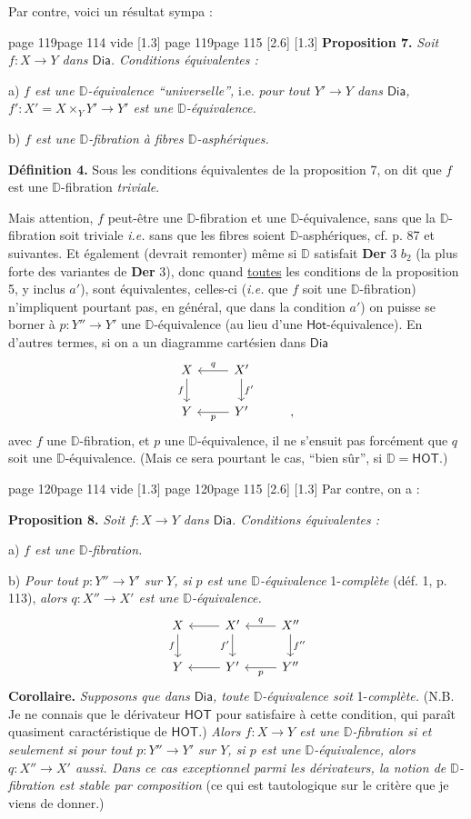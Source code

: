\documentclass[11pt,leqno]{article}
\newcommand{\msp}[1]{%
  \begingroup\def\thismsp{#1}\def\blankmsp{page 114 vide}%
  \ifx\thismsp\blankmsp
    \marginnote{\scriptsize\sffamily [114: vide]}[1.3\baselineskip]%
  \else\def\followingmsp{page 115}%
    \ifx\thismsp\followingmsp
      \marginnote{\scriptsize\sffamily [page 115]}[2.6\baselineskip]%
    \else\marginnote{\scriptsize\sffamily [#1]}[1.3\baselineskip]\fi
  \fi\endgroup}
\newcommand{\Dia}{\ensuremath{\mathsf{Dia}}}
\newcommand{\Hot}{\ensuremath{\mathsf{Hot}}}
\newcommand{\HOT}{\ensuremath{\mathsf{HOT}}}
\newcommand{\D}{\ensuremath{\mathbb{D}}}
\begin{document}
Par contre, voici un résultat sympa :

\msp{page 119}\textbf{Proposition 7.} \textit{Soit $f : X \to Y$ dans \Dia. Conditions équivalentes :}

a) \textit{$f$ est une $\D$-équivalence “universelle”,} i.e. \textit{pour tout $Y' \to Y$ dans \Dia, $f' : X' = X \times_Y Y' \to Y'$ est une $\D$-équivalence.}

b) \textit{$f$ est une $\D$-fibration à fibres $\D$-asphériques.}

\textbf{Définition 4.} Sous les conditions équivalentes de la proposition 7, on dit que $f$ est une $\D$-fibration \textit{triviale}.

Mais attention, $f$ peut-être une $\D$-fibration et une $\D$-équivalence, sans que la $\D$-fibration soit triviale \textit{i.e.} sans que les fibres soient $\D$-asphériques, cf. p. 87 et suivantes. %
Et également (devrait remonter) même si $\D$ satisfait \textbf{Der} 3 $b_2$ (la plus forte des variantes de \textbf{Der} 3), donc quand \underline{toutes} les conditions de la proposition 5, y inclus $a'$), sont équivalentes, celles-ci (\textit{i.e.} que $f$ soit une $\D$-fibration) n'impliquent pourtant pas, en général, que dans la condition $a'$) on puisse se borner à $p : Y'' \to Y'$ une $\D$-équivalence (au lieu d'une \Hot-équivalence). En d'autres termes, si on a un diagramme cartésien dans \Dia
\[
\begin{tikzcd}
X \arrow[d, "f"'] & X' \arrow[l, "q"'] \arrow[d, "f'"] \\
Y & Y' \arrow[l, "p"] & ,
\end{tikzcd}
\]
avec $f$ une $\D$-fibration, et $p$ une $\D$-équivalence, il ne s'ensuit pas forcément que $q$ soit une $\D$-équivalence. (Mais ce sera pourtant le cas, “bien sûr”, si $\D = \HOT$.)

\msp{page 120}Par contre, on a :

\textbf{Proposition 8.} \textit{Soit $f : X \to Y$ dans \Dia. Conditions équivalentes :}

a) \textit{$f$ est une $\D$-fibration.}

b) \textit{Pour tout $p : Y'' \to Y'$ sur $Y$, si $p$ est une $\D$-équivalence} 1-\textit{complète} (déf. 1, p. 113), \textit{alors $q : X'' \to X'$ est une $\D$-équivalence.}
\[
\begin{tikzcd}
X \arrow[d, "f"'] & X' \arrow[l] \arrow[d, "f'"'] & X'' \arrow[l, "q"'] \arrow[d, "f''"] \\
Y & Y' \arrow[l] & Y'' \arrow[l, "p"]
\end{tikzcd}
\]
\textbf{Corollaire.} \textit{Supposons que dans \Dia, toute $\D$-équivalence soit} 1-\textit{complète.} (N.B. Je ne connais que le dérivateur \HOT{} pour satisfaire à cette condition, qui paraît quasiment caractéristique de \HOT.) \textit{Alors $f : X \to Y$ est une $\D$-fibration si et seulement si pour tout $p : Y'' \to Y'$ sur $Y$, si $p$ est une $\D$-équivalence, alors $q : X'' \to X'$ aussi. Dans ce cas exceptionnel parmi les dérivateurs, la notion de $\D$-fibration est stable par composition} (ce qui est tautologique sur le critère que je viens de donner.)
\end{document}
